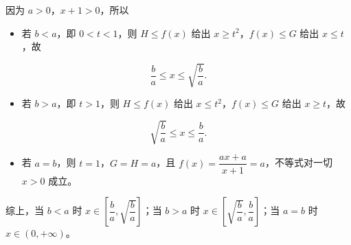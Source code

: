 \begin{answer}
因为 $a>0$，$x+1>0$，所以

\begin{itemize}
\item 若 $b<a$，即 $0<t<1$，则 $H\leqslant f(x)$ 给出 $x\geqslant t^2$，$f(x)\leqslant G$ 给出 $x\leqslant t$，故
\end{itemize}
\nopagebreak[4]
\[\frac ba\leqslant x\leqslant\sqrt{\frac ba}.\]
\begin{itemize}
\item 若 $b>a$，即 $t>1$，则 $H\leqslant f(x)$ 给出 $x\leqslant t^2$，$f(x)\leqslant G$ 给出 $x\geqslant t$，故
\end{itemize}
\nopagebreak[4]
\[\sqrt{\frac ba}\leqslant x\leqslant\frac ba.\]
\begin{itemize}
\item 若 $a=b$，则 $t=1$，$G=H=a$，且 $f(x)=\dfrac{ax+a}{x+1}=a$，不等式对一切 $x>0$ 成立。
\end{itemize}

综上，当 $b<a$ 时 $x\in\left[\dfrac ba,\sqrt{\dfrac ba}\right]$；当 $b>a$ 时 $x\in\left[\sqrt{\dfrac ba},\dfrac ba\right]$；当 $a=b$ 时 $x\in(0,+\infty)$。



\end{answer}
